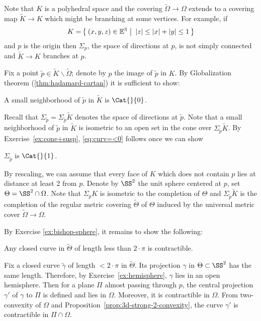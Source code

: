 Note that $K$ is a polyhedral space and the covering $\tilde\Omega\to\Omega$ extends to a covering map $\tilde K\to K$ which might be branching at some vertices.
For example, if \[K=\set{(x,y,z)\in\EE^3}{|z|\le |x|+|y|\le 1}\] and $p$ is the origin then $\Sigma_p$,
the space of directions at $p$,
is not simply connected and $\tilde K\to K$ branches at $p$.


Fix a point $\tilde p\in \tilde K\backslash\tilde\Omega$; 
denote by $p$ the image of $\tilde p$ in $K$.
By Globalization theorem (\ref{thm:hadamard-cartan}) it is sufficient to show:

\begin{clm}{}\label{eq:curv=<0}
A small neighborhood of $\tilde p$ in $\tilde K$ is $\Cat{}{0}$.
\end{clm}

Recall that $\Sigma_{\tilde p}=\Sigma_{\tilde p}\tilde K$ denotes the space of directions at $\tilde p$.
Note that a small neighborhood of $\tilde p$ in $\tilde K$
is isometric to an open set in the cone over $\Sigma_{\tilde p}\tilde K$.
By Exercise~\ref{ex:cone+susp}, \ref{eq:curv=<0} follows once we can show 

\begin{clm}{}\label{eq:curv=<1}
$\Sigma_{\tilde p}$ is $\Cat{}{1}$.
\end{clm}

By  rescaling, we can assume that every face of $K$ which does not contain $p$ lies at distance at least 2 from $p$.
Denote by $\SS^2$ the unit sphere centered at $p$,
set $\Theta=\SS^2\cap\Omega$.
Note that $\Sigma_pK$ is isometric to the completion of $\Theta$
and $\Sigma_{\tilde p}\tilde K$ is the completion of the regular metric covering $\tilde\Theta$ of $\Theta$  induced by the universal metric cover $\tilde \Omega\to \Omega$.

By Exercise \ref{ex:bishop-sphere}, it remains to show  the following:
\begin{clm}{}
Any closed curve in $\tilde\Theta$ of length less than $2\cdot\pi$ is contractible.
\end{clm}

Fix a closed curve $\tilde \gamma$ of length $<2\cdot\pi$ in $\tilde\Theta$.
Its projection $\gamma$ in $\Theta\subset\SS^2$ has the same length.
Therefore, by Exercise~\ref{ex:hemisphere}, $\gamma$ lies in an open hemisphere.
Then for a plane $\Pi$ almost passing through $p$,
the central projection $\gamma'$ of $\gamma$ to $\Pi$ is defined and lies in $\Omega$. 
Moreover, it is contractible in $\Omega$.
From two-convexity of $\Omega$
and Proposition~\ref{prop:3d-strong-2-convexity},
the curve $\gamma'$ is contractible in $\Pi\cap \Omega$.


